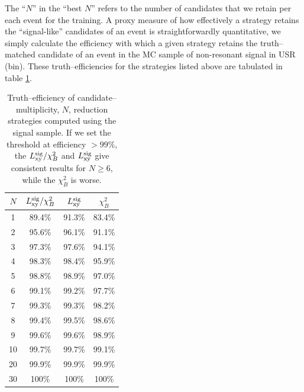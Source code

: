 The ``$N$'' in the ``best $N$'' refers to the number of candidates that we retain per each event for the training.
A proxy measure of how effectively a strategy retains the ``signal-like'' candidates of an event is straightforwardly quantitative, we simply calculate the efficiency with which a given strategy retains the truth--matched candidate of an event in the MC sample of non-resonant signal in USR (\lowqs bin).
These truth--efficiencies for the strategies listed above are tabulated in table \ref{tab:truth-efficiencies-baseline-selection}.
\begin{table}[!ht]
\centering
\caption{Truth--efficiency of candidate--multiplicity, $N$, reduction strategies computed using the \BeeKStar signal sample. If we set the threshold at efficiency $>99\%$, the $L_{\rm xy}^\text{sig}/\chi^2_{B}$ and $L_{\rm xy}^\text{sig}$ give consistent results for $N\geq 6$, while the $\chi^2_{B}$ is worse.}
\label{tab:truth-efficiencies-baseline-selection} 
\vspace{0.1cm}
\begin{tabular}{|| c || c | c | c ||} 
 \hline
$N$ & $L_{\rm xy}^\text{sig}/\chi^2_{B}$ & $L_{\rm xy}^\text{sig}$ & $\chi^2_{B}$ \\
\hline
\hline
1 & 89.4\% & 91.3\% & 83.4\% \\
\hline
2 & 95.6\% & 96.1\% & 91.1\% \\
\hline
3 & 97.3\% & 97.6\% & 94.1\% \\
\hline
4 & 98.3\% & 98.4\% & 95.9\% \\
\hline
5 & 98.8\% & 98.9\% & 97.0\% \\
\hline
6 & 99.1\% & 99.2\% & 97.7\% \\
\hline
7 & 99.3\% & 99.3\%  & 98.2\% \\
\hline
8 & 99.4\% & 99.5\% & 98.6\% \\
\hline
9 & 99.6\% & 99.6\%  & 98.9\% \\
\hline
10 & 99.7\% & 99.7\% & 99.1\% \\
\hline
20 & 99.9\% & 99.9\%  & 99.9\% \\
\hline
30 & 100\% & 100\% & 100\% \\
\hline
\end{tabular}
\end{table}

